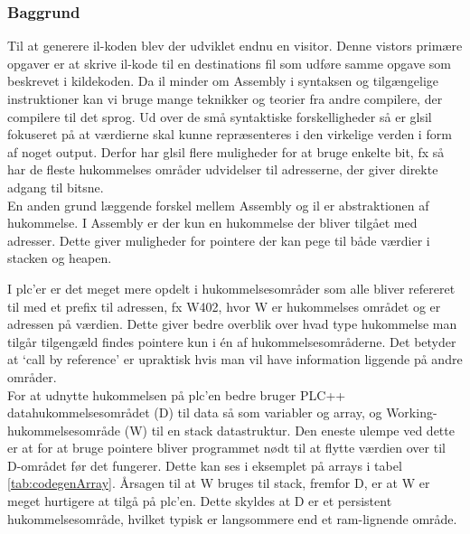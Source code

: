 \subsubsection{Baggrund}
Til at generere \gls{il}-koden blev der udviklet endnu en visitor. Denne vistors primære opgaver er at skrive \gls{il}-kode til en destinations fil som udføre samme opgave som beskrevet i kildekoden. Da \gls{il} minder om Assembly i syntaksen og tilgængelige instruktioner kan vi bruge mange teknikker og teorier fra andre compilere, der compilere til det sprog. Ud over de små syntaktiske forskelligheder så er gls{il} fokuseret på at værdierne skal kunne repræsenteres i den virkelige verden i form af noget output. Derfor har gls{il} flere muligheder for at bruge enkelte bit, fx så har de fleste hukommelses områder udvidelser til adresserne, der giver direkte adgang til bitsne. \\

\noindent En anden grund læggende forskel mellem Assembly og \gls{il} er abstraktionen af hukommelse. I Assembly er der kun en hukommelse der bliver tilgået med adresser. Dette giver muligheder for pointere der kan pege til både værdier i stacken og heapen.

\noindent I \gls{plc}'er er det meget mere opdelt i hukommelsesområder som alle bliver refereret til med et prefix til adressen, fx {\ttfamily W402}, hvor {\ttfamily W} er hukommelses området og {} er adressen på værdien. Dette giver bedre overblik over hvad type hukommelse man tilgår tilgengæld findes pointere kun i én af hukommelsesområderne. Det betyder at \enquote*{call by reference} er upraktisk hvis man vil have information liggende på andre områder.\\

\noindent For at udnytte hukommelsen på \gls{plc}'en bedre bruger PLC++ datahukommelsesområdet ({\ttfamily D}) til data så som variabler og array, og Working-hukommelsesområde ({\ttfamily W}) til en stack datastruktur. Den eneste ulempe ved dette er at for at bruge pointere bliver programmet nødt til at flytte værdien over til {\ttfamily D}-området før det fungerer. Dette kan ses i eksemplet på arrays i tabel \ref{tab:codegenArray}. Årsagen til at {\ttfamily W} bruges til stack, fremfor {\ttfamily D}, er at {\ttfamily W} er meget hurtigere at tilgå på \gls{plc}'en. Dette skyldes at {\ttfamily D} er et persistent hukommelsesområde, hvilket typisk er langsommere end et ram-lignende område.